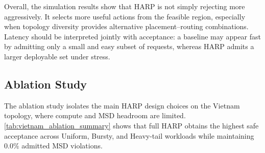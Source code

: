 \documentclass[final,5p]{elsarticle}
\begin{document}
\begin{table}[t]
\centering
\caption{Burst-surge simulation results on the Vietnam backbone and GEANT2 topologies.}
\label{tab:burst_results}
\end{table}

Overall, the simulation results show that HARP is not simply rejecting more aggressively. It selects more useful actions from the feasible region, especially when topology diversity provides alternative placement--routing combinations. Latency should be interpreted jointly with acceptance: a baseline may appear fast by admitting only a small and easy subset of requests, whereas HARP admits a larger deployable set under stress.

\subsection{Ablation Study}
\label{subsec:ablation_study}

The ablation study isolates the main HARP design choices on the Vietnam topology, where compute and MSD headroom are limited. \autoref{tab:vietnam_ablation_summary} shows that full HARP obtains the highest safe acceptance across Uniform, Bursty, and Heavy-tail workloads while maintaining \(0.0\%\) admitted MSD violations.
\end{document}
